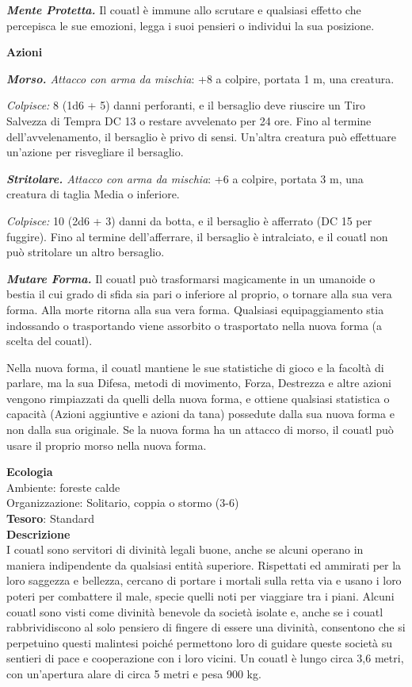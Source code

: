 \begin{multicols}{2}
\textit{\textbf{Mente Protetta.}} Il couatl è immune allo scrutare e qualsiasi effetto che percepisca le sue emozioni, legga i suoi pensieri o individui la sua posizione.

\textbf{Azioni}

\textit{\textbf{Morso.} Attacco con arma da mischia}: +8 a colpire, portata 1 m, una creatura.

\textit{Colpisce:} 8 (1d6 + 5) danni perforanti, e il bersaglio deve riuscire un Tiro Salvezza di Tempra DC 13 o restare avvelenato per 24 ore. Fino al termine dell'avvelenamento, il bersaglio è privo di sensi. Un'altra creatura può effettuare un'azione per risvegliare il bersaglio.

\textit{\textbf{Stritolare.} Attacco con arma da mischia}: +6 a colpire, portata 3 m, una creatura di taglia Media o inferiore.

\textit{Colpisce:} 10 (2d6 + 3) danni da botta, e il bersaglio è afferrato (DC 15 per fuggire). Fino al termine dell'afferrare, il bersaglio è intralciato, e il couatl non può stritolare un altro bersaglio.

\textit{\textbf{Mutare Forma.}} Il couatl può trasformarsi magicamente in un umanoide o bestia il cui grado di sfida sia pari o inferiore al proprio, o tornare alla sua vera forma. Alla morte ritorna alla sua vera forma. Qualsiasi equipaggiamento stia indossando o trasportando viene assorbito o trasportato nella nuova forma (a scelta del couatl).

Nella nuova forma, il couatl mantiene le sue statistiche di gioco e la facoltà di parlare, ma la sua Difesa, metodi di movimento, Forza, Destrezza e altre azioni vengono rimpiazzati da quelli della nuova forma, e ottiene qualsiasi statistica o capacità (Azioni aggiuntive e azioni da tana) possedute dalla sua nuova forma e non dalla sua originale. Se la nuova forma ha un attacco di morso, il couatl può usare il proprio morso nella nuova forma.

\textbf{Ecologia}\\
Ambiente: foreste calde\\
Organizzazione: Solitario, coppia o stormo (3-6)\\
\textbf{Tesoro}: Standard\\
\textbf{Descrizione}\\
I couatl sono servitori di divinità legali buone, anche se alcuni operano in maniera indipendente da qualsiasi entità superiore. Rispettati ed ammirati per la loro saggezza e bellezza, cercano di portare i mortali sulla retta via e usano i loro poteri per combattere il male, specie quelli noti per viaggiare tra i piani. Alcuni couatl sono visti come divinità benevole da società isolate e, anche se i couatl rabbrividiscono al solo pensiero di fingere di essere una divinità, consentono che si perpetuino questi malintesi poiché permettono loro di guidare queste società su sentieri di pace e cooperazione con i loro vicini. Un couatl è lungo circa 3,6 metri, con un'apertura alare di circa 5 metri e pesa 900 kg.


\end{multicols}
